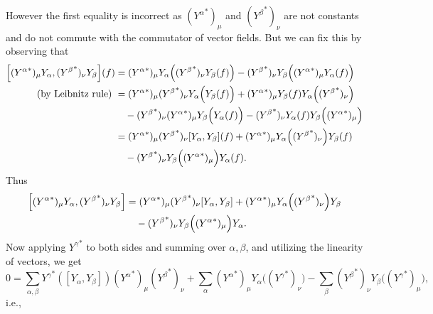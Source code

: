 \documentclass{note}
\numberwithin{equation}{chapter}
\begin{document}
However the first equality is incorrect as $({Y^\alpha}^*)_\mu$ and
$({Y^\beta}^*)_\nu$ are not constants and do not commute with the commutator of
vector fields. But we can fix this by observing that
\begin{align*}
  \left[({Y^\alpha}^*)_\mu Y_\alpha, ({Y^\beta}^*)_\nu Y_\beta\right](f)
   & = ({Y^\alpha}^*)_\mu Y_\alpha\prn{({Y^\beta}^*)_\nu Y_\beta(f)} -
  ({Y^\beta}^*)_\nu Y_\beta\Big(({Y^\alpha}^*)_\mu Y_\alpha(f)\Big)    \\
  \text{(by Leibnitz rule) }
   & =
  ({Y^\alpha}^*)_\mu ({Y^\beta}^*)_\nu Y_\alpha\Big(Y_\beta(f)\Big)
  + ({Y^\alpha}^*)_\mu Y_\beta(f) Y_\alpha\prn{({Y^\beta}^*)_\nu}      \\
   & \quad
  - ({Y^\beta}^*)_\nu ({Y^\alpha}^*)_\mu Y_\beta\Big(Y_\alpha(f)\Big)
  - ({Y^\beta}^*)_\nu Y_\alpha(f) Y_\beta\Big(({Y^\alpha}^*)_\mu\Big)  \\
   & =
  ({Y^\alpha}^*)_\mu ({Y^\beta}^*)_\nu [Y_\alpha, Y_\beta](f)
  + ({Y^\alpha}^*)_\mu Y_\alpha\prn{({Y^\beta}^*)_\nu} Y_\beta(f)      \\
   & \quad
  - ({Y^\beta}^*)_\nu Y_\beta\Big(({Y^\alpha}^*)_\mu\Big) Y_\alpha(f). \\
\end{align*}
Thus
\begin{align*}
  \left[({Y^\alpha}^*)_\mu Y_\alpha, ({Y^\beta}^*)_\nu Y_\beta\right]
   & = ({Y^\alpha}^*)_\mu ({Y^\beta}^*)_\nu [Y_\alpha, Y_\beta]
  + ({Y^\alpha}^*)_\mu Y_\alpha\prn{({Y^\beta}^*)_\nu} Y_\beta      \\
   & \quad
  - ({Y^\beta}^*)_\nu Y_\beta\Big(({Y^\alpha}^*)_\mu\Big) Y_\alpha. \\
\end{align*}
Now applying ${Y^\gamma}^*$ to both sides and summing over $\alpha, \beta$, and
utilizing the linearity of vectors, we get
\begin{equation*}
  0 = \sum_{\alpha,\beta}
  {Y^\gamma}^*([Y_\alpha, Y_\beta]) ({Y^\alpha}^*)_\mu({Y^\beta}^*)_\nu
  + \sum_\alpha ({Y^\alpha}^*)_\mu Y_\alpha\Big(({Y^\gamma}^*)_\nu\Big)
  - \sum_\beta ({Y^\beta}^*)_\nu Y_\beta\Big(({Y^\gamma}^*)_\mu\Big),
\end{equation*}
i.e.,
\end{document}
